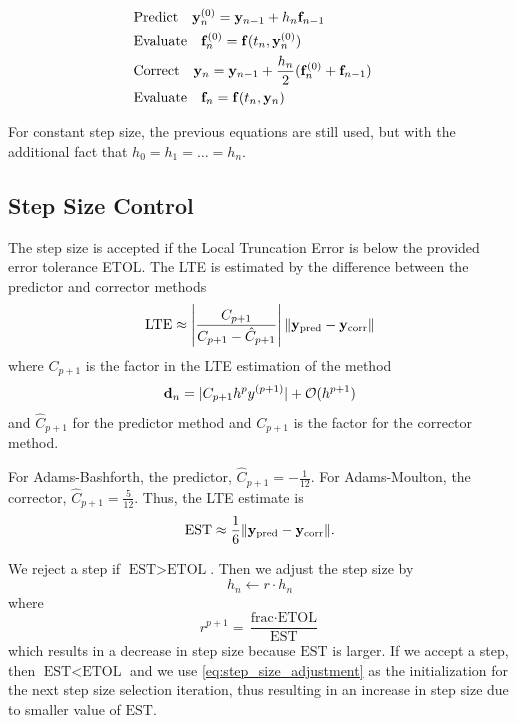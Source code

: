 \documentclass[12pt]{article}
\begin{document}
\begin{align}
	&\text{Predict} \quad \vb{y}_n^{(0)}=\vb{y}_{n-1}+h_n\vb{f}_{n-1}& \nonumber\\
	&\text{Evaluate}\quad \vb{f}_n^{(0)} = \vb{f}(t_n,\vb{y}_n^{(0)}) & \nonumber\\
	&\text{Correct}\quad \vb{y}_n=\vb{y}_{n-1}+\frac{h_n}{2}(\vb{f}_{n}^{(0)}+\vb{f}_{n-1}) & \label{eq:PECE_1o}\\
	&\text{Evaluate}\quad \vb{f}_n=\vb{f}(t_n,\vb{y}_n)& 
	\nonumber
\end{align}

For constant step size, the previous equations are still used, but with the additional fact that $h_0=h_1=\dots=h_n$.

\subsection*{Step Size Control}

The step size is accepted if the Local Truncation Error is below the provided error tolerance ETOL.
The LTE is estimated by the difference between the predictor and corrector methods
\begin{equation}
	\text{LTE}\approx\left|\frac{C_{p+1}}{C_{p+1}-\hat{C}_{p+1}}\right|\lVert \vb{y}_{\text{pred}}-\vb{y}_{\text{corr}} \rVert
	\label{eq:lte}
\end{equation}
where $C_{p+1}$ is the factor in the LTE estimation of the method
\begin{equation}
	\vb{d}_n=|C_{p+1}h^py^{(p+1)}|+\mathcal{O}(h^{p+1})
\end{equation}
and $\hat{C}_{p+1}$ for the predictor method and $C_{p+1}$ is the factor for the corrector method.

For Adams-Bashforth, the predictor, $\hat{C}_{p+1}=-\frac{1}{12}$.
For Adams-Moulton, the corrector, $\hat{C}_{p+1}=\frac{5}{12}$.
Thus, the LTE estimate is
\begin{equation}
	\text{EST}\approx\frac{1}{6}\lVert \vb{y}_{\text{pred}}-\vb{y}_{\text{corr}} \rVert.
	\label{eq:lte}
\end{equation}

We reject a step if $\text{EST}>\text{ETOL}$.
Then we adjust the step size by
\begin{equation}
	h_n\leftarrow r\cdot h_n
\end{equation}
where
\begin{equation}
	r^{p+1}=\frac{\text{frac}\cdot\text{ETOL}}{\text{EST}}
	\label{eq:step_size_adjustment}
\end{equation}
which results in a decrease in step size because $\text{EST}$ is larger.
If we accept a step, then $\text{EST}<\text{ETOL}$ and we use \eqref{eq:step_size_adjustment} as the initialization for the next step size selection iteration, thus resulting in an increase in step size due to smaller value of $\text{EST}$.
\end{document}
